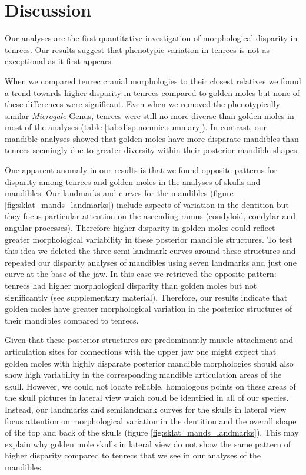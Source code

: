 \documentclass[12pt,a4paper]{article}
\begin{document}
\section{Discussion} 

	Our analyses are the first quantitative investigation of morphological disparity in tenrecs. Our results suggest that phenotypic variation in tenrecs is not as exceptional as it first appears.
	 
	When we compared tenrec cranial morphologies to their closest relatives we found a trend towards higher disparity in tenrecs compared to golden moles but none of these differences were significant. Even when we removed the phenotypically similar \textit{Microgale} Genus, tenrecs were still no more diverse than golden moles in most of the analyses (table \ref{tab:disp.nonmic.summary}). In contrast, our mandible analyses showed that golden moles have more disparate mandibles than tenrecs seemingly due to greater diversity within their posterior-mandible shapes.

	One apparent anomaly in our results is that we found opposite patterns for disparity among tenrecs and golden moles in the analyses of skulls and mandibles. 
	Our landmarks and curves for the mandibles (figure \ref{fig:sklat_mands_landmarks}) include aspects of variation in the dentition but they focus particular attention on the ascending ramus (condyloid, condylar and angular processes). Therefore higher disparity in golden moles could reflect greater morphological variability in these posterior mandible structures. To test this idea we deleted the three semi-landmark curves around these structures and repeated our disparity analyses of mandibles using seven landmarks and just one curve at the base of the jaw. In this case we retrieved the opposite pattern: tenrecs had higher morphological disparity than golden moles but not significantly (see supplementary material). Therefore, our results indicate that golden moles have greater morphological variation in the posterior structures of their mandibles compared to tenrecs.
		
			
	 Given that these posterior structures are predominantly muscle attachment and articulation sites for connections with the upper jaw %
	 one might expect that golden moles with highly disparate posterior mandible morphologies should also show high variability in the corresponding mandible articulation areas of the skull. However, we could not locate reliable, homologous points on these areas of the skull pictures in lateral view which could be identified in all of our species. Instead, our landmarks and semilandmark curves for the skulls in lateral view focus attention on morphological variation in the dentition and the overall shape of the top and back of the skulls (figure \ref{fig:sklat_mands_landmarks}). This may explain why golden mole skulls in lateral view do not show the same pattern of higher disparity compared to tenrecs that we see in our analyses of the mandibles.
	 	
\end{document}
